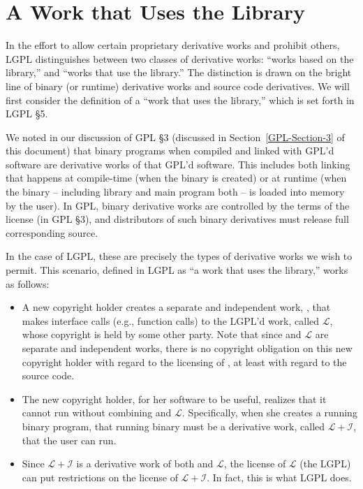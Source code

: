 \documentclass[11pt, letterpaper]{book}
\begin{document}
\section{A Work that Uses the Library}

In the effort to allow certain proprietary derivative works and prohibit
others, LGPL distinguishes between two classes of derivative works:
``works based on the library,'' and ``works that use the library.''  The
distinction is drawn on the bright line of binary (or runtime) derivative
works and source code derivatives. We will first consider the definition
of a ``work that uses the library,'' which is set forth in LGPL \S 5.

We noted in our discussion of GPL \S 3 (discussed in
Section~\ref{GPL-Section-3} of this document) that binary programs when
compiled and linked with GPL'd software are derivative works of that GPL'd
software. This includes both linking that happens at compile-time (when
the binary is created) or at runtime (when the binary -- including library
and main program both -- is loaded into memory by the user). In GPL,
binary derivative works are controlled by the terms of the license (in GPL
\S 3), and distributors of such binary derivatives must release full
corresponding source\@.

In the case of LGPL, these are precisely the types of derivative works
we wish to permit. This scenario, defined in LGPL as ``a work that uses
the library,'' works as follows:

\newcommand{\workl}{$\mathcal{L}$}
\newcommand{\lplusi}{$\mathcal{L\!\!+\!\!I}$}

\begin{itemize}

\item A new copyright holder creates a separate and independent work,
  \worki{}, that makes interface calls (e.g., function calls) to the
  LGPL'd work, called \workl{}, whose copyright is held by some other
  party. Note that since \worki{} and \workl{} are separate and
  independent works, there is no copyright obligation on this new copyright
  holder with regard to the licensing of \worki{}, at least with regard to
  the source code.

\item The new copyright holder, for her software to be useful, realizes
  that it cannot run without combining \worki{} and \workl{}.
  Specifically, when she creates a running binary program, that running
  binary must be a derivative work, called \lplusi{}, that the user can
  run.

\item Since \lplusi{} is a derivative work of both \worki{} and \workl{},
  the license of \workl{} (the LGPL) can put restrictions on the license
  of \lplusi{}. In fact, this is what LGPL does.

\end{itemize}
\end{document}
